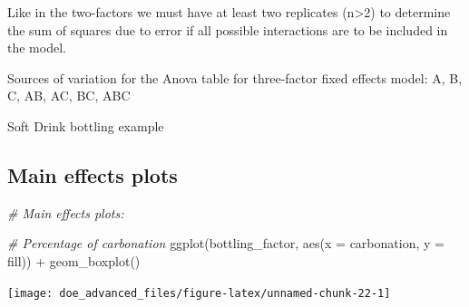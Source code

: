 \documentclass[
]{book}
\newenvironment{Shaded}{\begin{snugshade}}{\end{snugshade}}
\newcommand{\AttributeTok}[1]{\textcolor[rgb]{0.77,0.63,0.00}{#1}}
\newcommand{\CommentTok}[1]{\textcolor[rgb]{0.56,0.35,0.01}{\textit{#1}}}
\newcommand{\ConstantTok}[1]{\textcolor[rgb]{0.00,0.00,0.00}{#1}}
\newcommand{\FunctionTok}[1]{\textcolor[rgb]{0.00,0.00,0.00}{#1}}
\newcommand{\NormalTok}[1]{#1}
\newcommand{\OtherTok}[1]{\textcolor[rgb]{0.56,0.35,0.01}{#1}}
\newcommand{\SpecialCharTok}[1]{\textcolor[rgb]{0.00,0.00,0.00}{#1}}
\newcommand{\StringTok}[1]{\textcolor[rgb]{0.31,0.60,0.02}{#1}}
\begin{document}
Like in the two-factors we must have at least two replicates (n\textgreater2) to determine the sum of squares due to error if all possible interactions are to be included in the model.

Sources of variation for the Anova table for three-factor fixed effects model:
A, B, C, AB, AC, BC, ABC

Soft Drink bottling example

\begin{Shaded}
\end{Shaded}

\hypertarget{main-effects-plots}{%
\subsection{Main effects plots}\label{main-effects-plots}}

\begin{Shaded}
\begin{Highlighting}[]
\CommentTok{\# Main effects plots:}

\CommentTok{\# Percentage of carbonation}
\FunctionTok{ggplot}\NormalTok{(bottling\_factor, }\FunctionTok{aes}\NormalTok{(}\AttributeTok{x =}\NormalTok{ carbonation, }\AttributeTok{y =}\NormalTok{ fill)) }\SpecialCharTok{+}
  \FunctionTok{geom\_boxplot}\NormalTok{()}
\end{Highlighting}
\end{Shaded}

\texttt{[image: doe\_advanced\_files/figure-latex/unnamed-chunk-22-1]}
\end{document}
